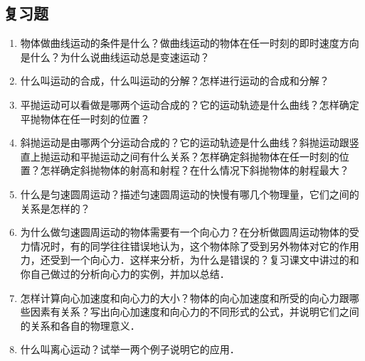\subsection*{复习题}

\begin{enumerate}
    \item 物体做曲线运动的条件是什么？做曲线运动的物体在任一时刻的即时速度方向是什么？为什么说曲线运动总是变速运动？
    \item 什么叫运动的合成，什么叫运动的分解？怎样进行运动的合成和分解？
    \item 平抛运动可以看做是哪两个运动合成的？它的运动轨迹是什么曲线？怎样确定平抛物体在任一时刻的位置？
    \item 斜抛运动是由哪两个分运动合成的？它的运动轨迹是什么曲线？斜抛运动跟竖直上抛运动和平抛运动之间有什么关系？怎样确定斜抛物体在任一时刻的位置？怎祥确定斜抛物体的射高和射程？在什么情况下斜抛物体的射程最大？
    \item 什么是匀速圆周运动？描述匀速圆周运动的快慢有哪几个物理量，它们之间的关系是怎样的？
    \item 为什么做匀速圆周运动的物体需要有一个向心力？在分析做圆周运动物体的受力情况时，有的同学往往错误地认为，这个物体除了受到另外物体对它的作用力，还受到一个向心力．这样来分析，为什么是错误的？复习课文中讲过的和你自己做过的分析向心力的实例，并加以总结．
    \item 怎样计算向心加速度和向心力的大小？物体的向心加速度和所受的向心力跟哪些因素有关系？写出向心加速度和向心力的不同形式的公式，并说明它们之间的关系和各自的物理意义．
    \item 什么叫离心运动？试举一两个例子说明它的应用．
\end{enumerate}
\newpage
